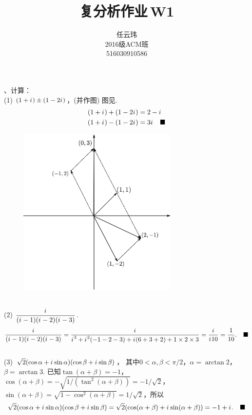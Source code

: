 

\title{复分析作业$\,$W1}
\author{\small 任云玮\\\small2016级ACM班\\\small516030910586}
\date{}


\maketitle

、计算：\\
(1) $(1+{i\mkern1mu})\pm(1-2{i\mkern1mu})$，(并作图)
\ans
  图见.
  \[\begin{split}
    (1+{i\mkern1mu})+(1-2{i\mkern1mu}) &= 2 - {i\mkern1mu}\\
    (1+{i\mkern1mu})-(1-2{i\mkern1mu})&=  3{i\mkern1mu} \quad\blacksquare
  \end{split}
  \]
  \begin{figure}[htbp]
    \centering
    \includegraphics[width=8cm]{./image/W1_1_1.png}
    \caption{}
    \label{fig1}
  \end{figure}
\\(2) $\dfrac{{i\mkern1mu}}{({i\mkern1mu}-1)({i\mkern1mu}-2)({i\mkern1mu}-3)}$.
\ans
  \[
    \frac{{i\mkern1mu}}{({i\mkern1mu}-1)({i\mkern1mu}-2)({i\mkern1mu}-3)}=
    \frac{{i\mkern1mu}}{{i\mkern1mu}^3 + {i\mkern1mu}^2(-1-2-3) + {i\mkern1mu}(6+3+2) + 1\times 2\times3}
    =\frac{{i\mkern1mu}}{{i\mkern1mu} 10} = \frac{1}{10}.\quad\blacksquare
  \]
\\(3) $\sqrt{2}(\cos\alpha + {i\mkern1mu}\sin\alpha)(\cos\beta+{i\mkern1mu}\sin\beta)$，
  其中$0<\alpha,\beta<\pi/2$，$\alpha=\arctan2$，$\beta=\arctan3$.
\ans
  已知$\tan(\alpha+\beta)=-1$，
  $\cos(\alpha+\beta)=-\sqrt{1/(\tan^2(\alpha+\beta))}=-1/\sqrt{2}$，
  $\sin(\alpha+\beta)=\sqrt{1-\cos^2(\alpha+\beta)}=1/\sqrt{2}$，所以
  \[\begin{split}
    \sqrt{2}(\cos\alpha + {i\mkern1mu}\sin\alpha)(\cos\beta+{i\mkern1mu}\sin\beta)
    = \sqrt{2}(\cos(\alpha+\beta) + {i\mkern1mu}\sin(\alpha+\beta))
    = -1+{i\mkern1mu}.\quad\blacksquare
  \end{split}\]

